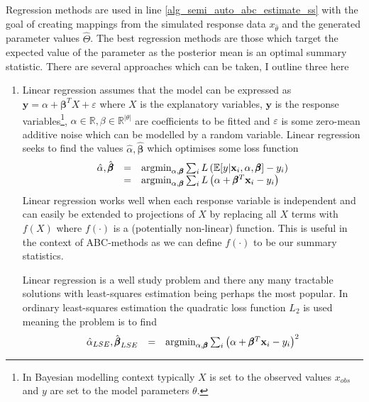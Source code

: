 \documentclass[bibliography=totoc,11pt,a4paper,margin=0]{article}
\newcommand*{\expect}{\mathbb{E}}
\theoremstyle{break}
\begin{document}
  \par Regression methods are used in line \ref{alg_semi_auto_abc_estimate_ss} with the goal of creating mappings from the simulated response data $x_{\hat\theta}$ and the generated parameter values $\hat\Theta$. The best regression methods are those which target the expected value of the parameter as the posterior mean is an optimal summary statistic. There are several approaches which can be taken, I outline three here
  \begin{enumerate} %
    \everymath={\displaystyle}
    \item Linear regression \cite[]{constructing_summary_statistics_for_approximate_bayesian_computation_semi_automatic_ABC} assumes that the model can be expressed as $\mathbf{y}=\alpha+\pmb\beta^T X+\varepsilon$ where $X$ is the explanatory variables, $\mathbf{y}$ is the response variables\footnote{In Bayesian modelling context typically $X$ is set to the observed values $x_{obs}$ and $y$ are set to the model parameters $\theta$.}, $\alpha\in\mathbb{R},\beta\in\mathbb{R}^{|\theta|}$ are coefficients to be fitted and $\varepsilon$ is some zero-mean additive noise which can be modelled by a random variable. Linear regression seeks to find the values $\hat\alpha,\hat{\pmb\beta}$ which optimises some loss function
    \[\begin{array}{rcl}
      \everymath={\displaystyle}
      \hat\alpha,\hat{\pmb\beta}&=&\text{argmin}_{\alpha,\pmb\beta}\sum_i L\left(\expect[y|\mathbf{x}_i,\alpha,\pmb\beta]-y_i\right)\\
      &=&\text{argmin}_{\alpha,\pmb\beta}\sum_i L\left(\alpha+\pmb\beta^T\mathbf{x}_i-y_i\right)
    \end{array}\]
    Linear regression works well when each response variable is independent and  can easily be extended to projections of $X$ by replacing all $X$ terms with $f(X)$ where $f(\cdot)$ is a (potentially non-linear) function. This is useful in the context of ABC-methods as we can define $f(\cdot)$ to be our summary statistics.
    \par Linear regression is a well study problem and there any many tractable solutions with least-squares estimation being perhaps the most popular. In ordinary least-squares estimation the quadratic loss function $L_2$ is used meaning the problem is to find
    \[\begin{array}{rcl}
      \everymath={\displaystyle}
      \hat\alpha_{LSE},\hat{\pmb\beta}_{LSE}&=&\text{argmin}_{\alpha,\pmb\beta}\sum_i \left(\alpha+\pmb\beta^T\mathbf{x}_i-y_i\right)^2\\

\end{array}\]
\end{enumerate}
\end{document}
